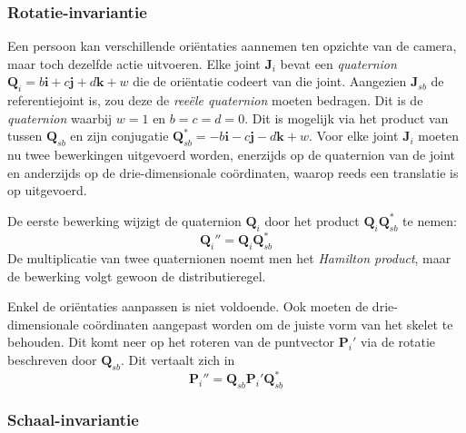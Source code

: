 \subsubsection{Rotatie-invariantie}
Een persoon kan verschillende oriëntaties aannemen ten opzichte van de camera, maar toch dezelfde actie uitvoeren. Elke joint $\textbf{J}_i$ bevat een \textit{quaternion} $\textbf{Q}_i = b\textbf{i} + c\textbf{j} + d\textbf{k} + w$ die de oriëntatie codeert van die joint. Aangezien $\textbf{J}_{sb}$ de referentiejoint is, zou deze de \textit{reeële quaternion} moeten bedragen. Dit is de \textit{quaternion} waarbij $w = 1$ en $b = c = d = 0$. Dit is mogelijk via het product van tussen $\textbf{Q}_{sb}$ en zijn conjugatie  $\textbf{Q}_{sb}^* = -b\textbf{i} - c\textbf{j} - d\textbf{k} + w$. Voor elke joint $\textbf{J}_i$ moeten nu twee bewerkingen uitgevoerd worden, enerzijds op de quaternion van de joint en anderzijds op de  drie-dimensionale coördinaten, waarop reeds een translatie is op uitgevoerd.

De eerste bewerking wijzigt de quaternion $\textbf{Q}_i$ door het product $\textbf{Q}_i\textbf{Q}_{sb}^*$ te nemen:
$$\textbf{Q}_i'' = \textbf{Q}_i\textbf{Q}_{sb}^*$$
De multiplicatie van twee quaternionen noemt men het \textit{Hamilton product}, maar de bewerking volgt gewoon de distributieregel.

Enkel de oriëntaties aanpassen is niet voldoende. Ook moeten de drie-dimensionale coördinaten aangepast worden om de juiste vorm van het skelet te behouden. Dit komt neer op het roteren van de puntvector $\textbf{P}_i'$ via de rotatie beschreven door $\textbf{Q}_{sb}$. Dit vertaalt zich in
$$\textbf{P}_i'' = \textbf{Q}_{sb}\textbf{P}_i'\textbf{Q}_{sb}^*$$

\subsubsection{Schaal-invariantie}





